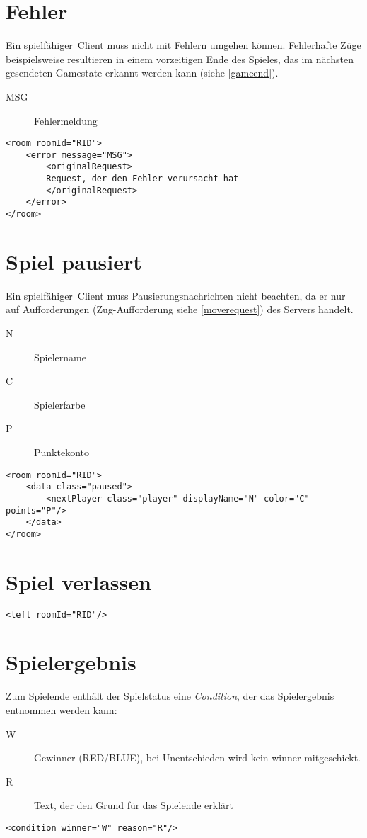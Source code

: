 \documentclass[12pt,a4paper, ngerman, oneside]{scrartcl}
\begin{document}
\section{Fehler}
Ein \glqq spielf\"ahiger\grqq\ Client muss nicht mit Fehlern umgehen k\"onnen.
Fehlerhafte Z\"uge beispielsweise resultieren in einem vorzeitigen Ende des
Spieles, das im n\"achsten gesendeten Gamestate erkannt werden kann (siehe \ref{gameend}).
\begin{description}
\item[MSG] Fehlermeldung
\end{description}
\begin{verbatim}
<room roomId="RID">
	<error message="MSG">
		<originalRequest>
		Request, der den Fehler verursacht hat
		</originalRequest>
	</error>
</room>
\end{verbatim}

\section{Spiel pausiert}
Ein \glqq spielf\"ahiger\grqq\ Client muss Pausierungsnachrichten nicht beachten,
da er nur auf Aufforderungen (Zug-Aufforderung siehe \ref{moverequest}) des Servers handelt.
\begin{description}
\item[N] Spielername
\item[C] Spielerfarbe
\item[P] Punktekonto
\end{description}
\begin{verbatim}
<room roomId="RID">
	<data class="paused">
		<nextPlayer class="player" displayName="N" color="C" points="P"/>
	</data>
</room>
\end{verbatim}

\section{Spiel verlassen}
\begin{verbatim}
<left roomId="RID"/>
\end{verbatim}


\section{\label{gameend}Spielergebnis}
Zum Spielende enth\"alt der Spielstatus eine \textit{Condition}, der das Spielergebnis entnommen werden kann:
\begin{description}
\item[W] Gewinner (RED/BLUE), bei Unentschieden wird kein winner mitgeschickt.
\item[R] Text, der den Grund f\"ur das Spielende erkl\"art
\end{description}
\begin{verbatim}
<condition winner="W" reason="R"/>
\end{verbatim}
\end{document}
